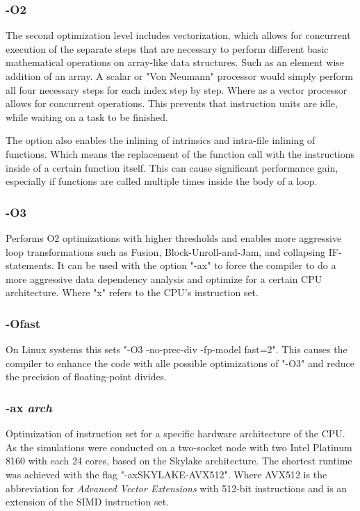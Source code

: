 \documentclass[a4paper, 11pt, oneside]{scrartcl}
\begin{document}
\subsubsection*{-O2}
The second optimization level includes vectorization, which allows for concurrent execution of the separate steps that are necessary to perform different basic mathematical operations on array-like data structures. Such as an element wise addition of an array. A scalar or "Von Neumann" processor would simply perform all four necessary steps for each index step by step. Where as a vector processor allows for concurrent operations. This prevents that instruction units are idle, while waiting on a task to be finished.

The option also enables the inlining of intrinsics and intra-file inlining of functions. Which means the replacement of the function call with the instructions inside of a certain function itself. This can cause significant performance gain, especially if functions are called multiple times inside the body of a loop.

\subsubsection*{-O3}
Performs O2 optimizations with higher thresholds and enables more aggressive loop transformations such as Fusion, Block-Unroll-and-Jam, and collapsing IF-statements. It can be used with the option "-ax" to force the compiler to do a more aggressive data dependency analysis and optimize for a certain CPU architecture. Where "x" refers to the CPU's instruction set.

\subsubsection*{-Ofast}
On Linux systems this sets "-O3 -no-prec-div -fp-model fast=2". This causes the compiler to enhance the code with alle possible optimizations of "-O3" and reduce the precision of floating-point divides.

\subsubsection*{-ax \textit{arch}}
Optimization of instruction set for a specific hardware architecture of the CPU. As the simulations were conducted on a two-socket node with two Intel Platinum 8160 with each 24 cores, based on the Skylake architecture. The shortest runtime was achieved with the flag "-axSKYLAKE-AVX512". Where AVX512 is the abbreviation for \textit{Advanced Vector Extensions} with 512-bit instructions and is an extension of the SIMD instruction set. 
\end{document}
